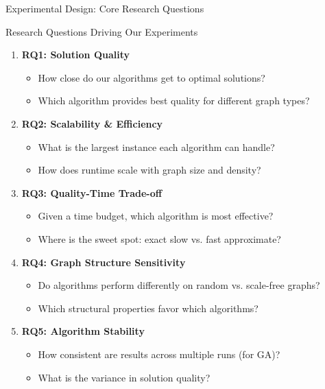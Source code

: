 \documentclass[aspectratio=169]{beamer}
\begin{document}
\begin{frame}{Experimental Design: Core Research Questions}
	\begin{block}{Research Questions Driving Our Experiments}
		\begin{enumerate}
			\item \textbf{RQ1: Solution Quality}
			      \begin{itemize}
				      \scriptsize
				      \item How close do our algorithms get to optimal solutions?
				      \item Which algorithm provides best quality for different graph types?
			      \end{itemize}
			
			\item \textbf{RQ2: Scalability \& Efficiency}
			      \begin{itemize}
				      \scriptsize
				      \item What is the largest instance each algorithm can handle?
				      \item How does runtime scale with graph size and density?
			      \end{itemize}
			
			\item \textbf{RQ3: Quality-Time Trade-off}
			      \begin{itemize}
				      \scriptsize
				      \item Given a time budget, which algorithm is most effective?
				      \item Where is the sweet spot: exact slow vs. fast approximate?
			      \end{itemize}
			
			\item \textbf{RQ4: Graph Structure Sensitivity}
			      \begin{itemize}
				      \scriptsize
				      \item Do algorithms perform differently on random vs. scale-free graphs?
				      \item Which structural properties favor which algorithms?
			      \end{itemize}
			
			\item \textbf{RQ5: Algorithm Stability}
			      \begin{itemize}
				      \scriptsize
				      \item How consistent are results across multiple runs (for GA)?
				      \item What is the variance in solution quality?
			      \end{itemize}
		\end{enumerate}
	\end{block}
\end{frame}
\end{document}
